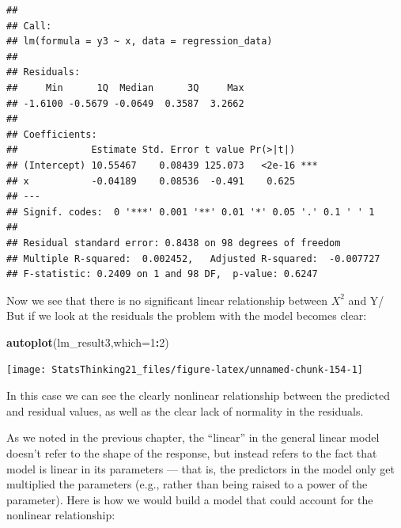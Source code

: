\documentclass[12pt,]{book}
\newenvironment{Shaded}{\begin{snugshade}}{\end{snugshade}}
\newcommand{\CommentTok}[1]{\textcolor[rgb]{0.56,0.35,0.01}{\textit{#1}}}
\newcommand{\DataTypeTok}[1]{\textcolor[rgb]{0.13,0.29,0.53}{#1}}
\newcommand{\DecValTok}[1]{\textcolor[rgb]{0.00,0.00,0.81}{#1}}
\newcommand{\KeywordTok}[1]{\textcolor[rgb]{0.13,0.29,0.53}{\textbf{#1}}}
\newcommand{\NormalTok}[1]{#1}
\newcommand{\OperatorTok}[1]{\textcolor[rgb]{0.81,0.36,0.00}{\textbf{#1}}}
\newcommand{\StringTok}[1]{\textcolor[rgb]{0.31,0.60,0.02}{#1}}
\begin{document}
\begin{verbatim}
## 
## Call:
## lm(formula = y3 ~ x, data = regression_data)
## 
## Residuals:
##     Min      1Q  Median      3Q     Max 
## -1.6100 -0.5679 -0.0649  0.3587  3.2662 
## 
## Coefficients:
##             Estimate Std. Error t value Pr(>|t|)    
## (Intercept) 10.55467    0.08439 125.073   <2e-16 ***
## x           -0.04189    0.08536  -0.491    0.625    
## ---
## Signif. codes:  0 '***' 0.001 '**' 0.01 '*' 0.05 '.' 0.1 ' ' 1
## 
## Residual standard error: 0.8438 on 98 degrees of freedom
## Multiple R-squared:  0.002452,   Adjusted R-squared:  -0.007727 
## F-statistic: 0.2409 on 1 and 98 DF,  p-value: 0.6247
\end{verbatim}

Now we see that there is no significant linear relationship between \(X^2\) and Y/ But if we look at the residuals the problem with the model becomes clear:

\begin{Shaded}
\begin{Highlighting}[]
\KeywordTok{autoplot}\NormalTok{(lm_result3,}\DataTypeTok{which=}\DecValTok{1}\OperatorTok{:}\DecValTok{2}\NormalTok{)}
\end{Highlighting}
\end{Shaded}

\texttt{[image: StatsThinking21\_files/figure-latex/unnamed-chunk-154-1]}

In this case we can see the clearly nonlinear relationship between the predicted and residual values, as well as the clear lack of normality in the residuals.

As we noted in the previous chapter, the ``linear'' in the general linear model doesn't refer to the shape of the response, but instead refers to the fact that model is linear in its parameters --- that is, the predictors in the model only get multiplied the parameters (e.g., rather than being raised to a power of the parameter). Here is how we would build a model that could account for the nonlinear relationship:

\begin{Shaded}
\end{Shaded}
\end{document}
